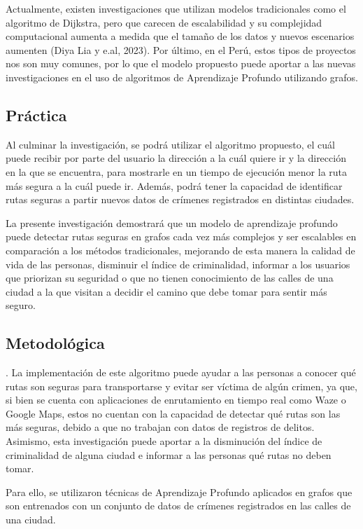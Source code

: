 Actualmente, existen investigaciones que utilizan modelos tradicionales como el algoritmo de Dijkstra, pero que carecen de escalabilidad y su complejidad computacional aumenta a medida que el tamaño de los datos y nuevos escenarios aumenten (Diya Lia y e.al, 2023). Por último, en el Perú, estos tipos de proyectos nos son muy comunes, por lo que el modelo propuesto puede aportar a las nuevas investigaciones en el uso de algoritmos de Aprendizaje Profundo utilizando grafos. 

\subsection{Práctica}

Al culminar la investigación, se podrá utilizar el algoritmo propuesto, el cuál puede recibir por parte del usuario la dirección a la cuál quiere ir y la dirección en la que se encuentra, para mostrarle en un tiempo de ejecución menor la ruta más segura a la cuál puede ir. Además, podrá tener la capacidad de identificar rutas seguras a partir nuevos datos de crímenes registrados en distintas ciudades. 

La presente investigación demostrará que un modelo de aprendizaje profundo puede detectar rutas seguras en grafos cada vez más complejos y ser escalables en comparación a los métodos tradicionales, mejorando de esta manera la calidad de vida de las personas, disminuir el índice de criminalidad, informar a los usuarios que priorizan su seguridad o que no tienen conocimiento de las calles de una ciudad a la que visitan a decidir el camino que debe tomar para sentir más seguro.

\subsection{Metodológica}. 
La implementación de este algoritmo puede ayudar a las personas a conocer qué rutas son seguras para transportarse y evitar ser víctima de algún crimen, ya que, si bien se cuenta con aplicaciones de enrutamiento en tiempo real como Waze o Google Maps, estos no cuentan con la capacidad de detectar qué rutas son las más seguras, debido a que no trabajan con datos de registros de delitos. Asimismo, esta investigación puede aportar a la disminución del índice de criminalidad de alguna ciudad e informar a las personas qué rutas no deben tomar.

Para ello, se utilizaron técnicas de Aprendizaje Profundo aplicados en grafos que son entrenados con un conjunto de datos de crímenes registrados en las calles de una ciudad.

